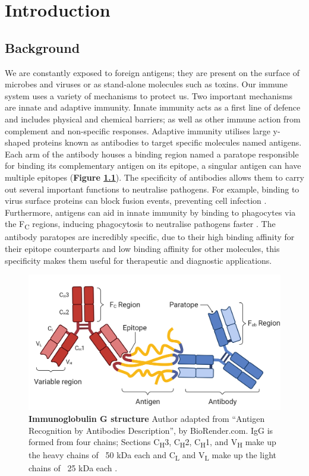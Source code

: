 \chapter{Introduction}

\section{Background}

We are constantly exposed to foreign antigens; they are present on the surface of microbes and viruses or as stand-alone molecules such as toxins. Our immune system uses a variety of mechanisms to protect us. Two important mechanisms are innate and adaptive immunity. Innate immunity acts as a first line of defence and includes physical and chemical barriers; as well as other immune action from complement and non-specific responses. Adaptive immunity utilises large y-shaped proteins known as antibodies to target specific molecules named antigens. Each arm of the antibody houses a binding region \cite{edelmanAntibodyStructureMolecular1973} named a paratope responsible for binding its complementary antigen on its epitope, a singular antigen can have multiple epitopes (\textbf{Figure \ref{fig:AntibodyStructure}}). The specificity of antibodies allows them to carry out several important functions to neutralise pathogens. For example, binding to virus surface proteins can block fusion events, preventing cell infection \cite{chenHumanMonoclonalAntibodies2020}. Furthermore, antigens can aid in innate immunity by binding to phagocytes via the F\textsubscript{C} regions, inducing phagocytosis to neutralise pathogens faster \cite{forthalFunctionsAntibodies2014b}. The antibody paratopes are incredibly specific, due to their high binding affinity for their epitope counterparts and low binding affinity for other molecules, this specificity makes them useful for therapeutic and diagnostic applications.

\begin{figure}
    \centering
    \includegraphics[width=0.9\linewidth]{./images/antibodies.png}
    \caption{\textbf{Immunoglobulin G structure} Author adapted from “Antigen Recognition by Antibodies Description”, by BioRender.com. IgG is formed from four chains; Sections C\textsubscript{H}3, C\textsubscript{H}2, C\textsubscript{H}1, and V\textsubscript{H} make up the heavy chains of ~50 kDa each and C\textsubscript{L} and V\textsubscript{L} make up the light chains of ~25 kDa each \cite{edelmanAntibodyStructureMolecular1973}.}
    \label{fig:AntibodyStructure}
\end{figure}

